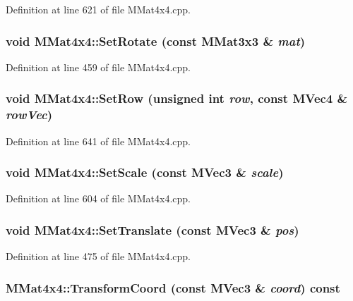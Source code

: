 Definition at line 621 of file MMat4x4.cpp.\hypertarget{class_m_mat4x4_37d2e5026e682b64a60ee7343cd814e9}{
\subsubsection[{SetRotate}]{\setlength{\rightskip}{0pt plus 5cm}void MMat4x4::SetRotate (const {\bf MMat3x3} \& {\em mat})}}
\label{class_m_mat4x4_37d2e5026e682b64a60ee7343cd814e9}




Definition at line 459 of file MMat4x4.cpp.\hypertarget{class_m_mat4x4_2c628c08af200deb17e1bad137bafbaa}{
\subsubsection[{SetRow}]{\setlength{\rightskip}{0pt plus 5cm}void MMat4x4::SetRow (unsigned int {\em row}, \/  const {\bf MVec4} \& {\em rowVec})}}
\label{class_m_mat4x4_2c628c08af200deb17e1bad137bafbaa}




Definition at line 641 of file MMat4x4.cpp.\hypertarget{class_m_mat4x4_8ed6ef9ec48dacf59eda26bb8e3b721d}{
\subsubsection[{SetScale}]{\setlength{\rightskip}{0pt plus 5cm}void MMat4x4::SetScale (const {\bf MVec3} \& {\em scale})}}
\label{class_m_mat4x4_8ed6ef9ec48dacf59eda26bb8e3b721d}




Definition at line 604 of file MMat4x4.cpp.\hypertarget{class_m_mat4x4_ac06f72b0de0177bf7a98ccf4ddc5ed2}{
\subsubsection[{SetTranslate}]{\setlength{\rightskip}{0pt plus 5cm}void MMat4x4::SetTranslate (const {\bf MVec3} \& {\em pos})}}
\label{class_m_mat4x4_ac06f72b0de0177bf7a98ccf4ddc5ed2}




Definition at line 475 of file MMat4x4.cpp.\hypertarget{class_m_mat4x4_385cd0e1af4a803cfb38860de8195572}{
\subsubsection[{TransformCoord}]{ MMat4x4::TransformCoord (const {\bf MVec3} \& {\em coord}) const}}
\label{class_m_mat4x4_385cd0e1af4a803cfb38860de8195572}




